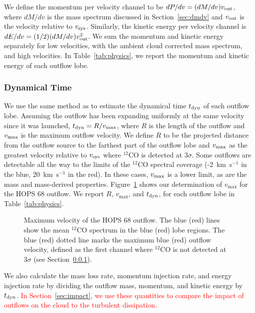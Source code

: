 \documentclass[twocolumn]{aastex63}
\newcommand{\example}{HOPS 68}
\newcommand{\kms}{km~s$^{-1}$}
\newcommand{\co}[1][]{\ensuremath{^{#1}}CO}
\begin{document}
We define the momentum per velocity channel to be $dP/dv = (dM/dv) v_{\rm out}$, where $dM/dv$ is the mass spectrum discussed in Section~\ref{sec:dmdv} and $v_{\rm out}$ is the velocity relative to $v_{\rm sys}$. Similarly, the kinetic energy per velocity channel is $dE/dv = (1/2) (dM/dv)  v_{\rm out}^2$. We sum the momentum and kinetic energy separately for low velocities, with the ambient cloud corrected mass spectrum, and high velocities. In Table~\ref{tab:physics}, we report the momentum and kinetic energy of each outflow lobe.

\subsubsection{Dynamical Time}\label{sec:tdyn}
We use the same method as \citet{Curtis10} to estimate the dynamical time $t_{\rm dyn}$ of each outflow lobe. Assuming the outflow has been expanding uniformly at the same velocity since it was launched, $t_{\rm dyn} = R / v_{\rm max}$, where $R$ is the length of the outflow and $v_{\rm max}$ is the maximum outflow velocity. We define $R$ to be the projected distance from the outflow source to the farthest part of the outflow lobe and $v_{\rm max}$ as the greatest velocity relative to $v_{\rm sys}$ where \co[12]{} is detected at $3\sigma$. Some outflows are detectable all the way to the limits of the \co[12]{} spectral coverage (-2~\kms{} in the blue, 20~\kms{} in the red). In these cases, $v_{\rm max}$ is a lower limit, as are the mass and mass-derived properties. Figure~\ref{fig:vmax} shows our determination of $v_{\max}$ for the \example{} outflow. We report $R$, $v_{\max}$, and $t_{\rm dyn}$, for each outflow lobe in Table~\ref{tab:physics}.

\begin{figure}
\caption{Maximum velocity of the \example{} outflow. The blue (red) lines show the mean \co[12]{} spectrum in the blue (red) lobe regions. The blue (red) dotted line marks the maximum blue (red) outflow velocity, defined as the first channel where \co[12]{} is not detected at $3\sigma$ (see Section~\ref{sec:tdyn}).\label{fig:vmax}}
\end{figure}

We also calculate the mass loss rate, momentum injection rate, and energy injection rate by dividing the outflow mass, momentum, and kinetic energy by $t_{\rm dyn}$. \textcolor{red}{In Section~\ref{sec:impact}, we use these quantities to compare the impact of outflows on the cloud to the turbulent dissipation.}
\end{document}
